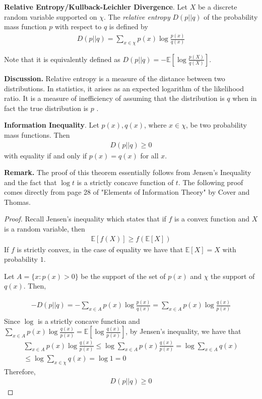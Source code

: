 \documentclass[12pt]{article}
\theoremstyle{definition}
\numberwithin{equation}{section}
\newcommand{\E}{\ensuremath{\mathbb{E}}}
\newcommand{\set}[1]{\{#1\}}
\begin{document}
 \textbf{Relative Entropy/Kullback-Leichler Divergence}. Let $X$ be a discrete random variable supported on $\chi$. The \emph{relative entropy} $D(p||q)$ of the probability mass function $p$ with respect to $q$ is defined by
\begin{gather*}
    D(p||q) = \sum_{x\in\chi}p(x)\log \frac{p(x)}{q(x)}
\end{gather*}

Note that it is equivalently defined as $D(p||q) = -\E[\log\frac{p(X)}{q(X)}]$.

\textbf{Discussion.}  Relative entropy is a measure of the distance between two distributions. In statistics, it arises as an expected logarithm of the likelihood ratio. It is a measure of inefficiency of assuming that the distribution is $q$ when in fact the true distribution is $p$ \citep{coverinfo}.

\theorem \textbf{Information Inequality}. Let $p(x), q(x)$, where $x\in \chi$, be two probability mass functions. Then
\begin{gather*}
    D(p||q) \geq 0
\end{gather*}
with equality if and only if $p(x) = q(x)$ for all $x$.

\textbf{Remark.} The proof of this theorem essentially follows from Jensen's Inequality and the fact that $\log t$ is a strictly concave function of $t$. The following proof comes directly from page 28 of "Elements of Information Theory" by Cover and Thomas.\smallskip

\begin{proof}
    Recall Jensen's inequality which states that if $f$ is a convex function and $X$ is a random variable, then
    \begin{gather*}
        \E[f(X)] \geq f(\E [X])
    \end{gather*}
    If $f$ is strictly convex, in the case of equality we have that $\E[X] = X$ with probability $1$.

    Let $A = \set{x:p(x) > 0}$ be the support of the set of $p(x)$ and $\chi$ the support of $q(x)$. Then,

    \begin{gather*}
        -D(p||q) = -\sum_{x\in A}p(x)\log\frac{p(x)}{q(x)} = \sum_{x\in A}p(x)\log\frac{q(x)}{p(x)} \\
    \end{gather*}
    Since $\log$ is a strictly concave function and $ \sum_{x\in A}p(x)\log\frac{q(x)}{p(x)} = \E[\log\frac{q(x)}{p(x)}]$, by Jensen's inequality, we have that
    \begin{gather*}
         \sum_{x\in A}p(x)\log\frac{q(x)}{p(x)} \leq \log \sum_{x \in A}p(x)\frac{q(x)}{p(x)} = \log\sum_{x\in A}q(x) \\
         \leq \log\sum_{x\in \chi} q(x) =\log 1 = 0
    \end{gather*}
    Therefore, 
    \begin{gather*}
        D(p||q) \geq 0
    \end{gather*}
\end{proof}
\end{document}
